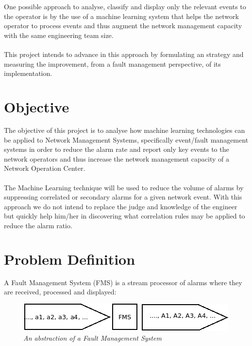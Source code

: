 \documentclass[10pt,a4paper]{article}
\begin{document}
 \\\\
 One possible approach to analyse, classify and display only the relevant events to the operator is by the use of a machine learning system that helps the network operator to process events and thus augment the network management capacity with the same engineering team size.
 \\\\
 This project intends to advance in this approach by formulating an strategy and measuring the improvement, from a fault management perspective, of its implementation.

 \section{Objective}
The objective of this project is to analyse how machine learning technologies can be applied to Network Management Systems, specifically event/fault management systems in order to reduce the alarm rate and report only key events to the network operators and thus increase the network management capacity of a Network Operation Center.
\\\\
The Machine Learning technique will be used to reduce the volume of alarms by suppressing correlated or secondary alarms for a given network event. With this approach we do not intend to replace the judge and knowledge of the engineer but quickly 
help him/her in discovering what correlation rules may be applied to reduce the alarm ratio.

  \section{Problem Definition}
A Fault Management System (FMS) is a stream processor of alarms where they are received, processed and displayed:

\begin{figure}[H]
 \includegraphics[scale=0.4]{NMS_FMS.png}
  \centering
  \caption{\textit{An abstraction of a Fault Management System}}
  \label{fig:nms_fms}
\end{figure}	
\end{document}
